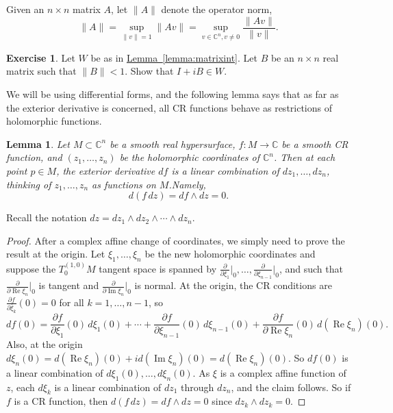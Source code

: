 \documentclass[12pt,openany]{book}
\renewcommand{\Re}{\operatorname{Re}}
\renewcommand{\Im}{\operatorname{Im}}
\newcommand{\snorm}[1]{\lVert {#1} \rVert}
\newcommand{\C}{{\mathbb{C}}}
\theoremstyle{plain}
\newtheorem{lemma}[thm]{Lemma}
\theoremstyle{remark}
\theoremstyle{definition}
\newenvironment{exbox}{%
    \def\FrameCommand{\vrule width 1pt \relax\hspace{10pt}}%
    \MakeFramed{\advance\hsize-\width\FrameRestore}%
}{%
    \endMakeFramed
}
\theoremstyle{exercise}
\newtheorem{exercise}{Exercise}[section]
\theoremstyle{example}
\newcommand{\lemmaref}[1]{\hyperref[#1]{Lemma~\ref*{#1}}}
\begin{document}
Given an $n \times n$ matrix $A$, let $\snorm{A}$ denote the operator norm,
\begin{equation*}
\snorm{A} = \sup_{\snorm{v}=1} \snorm{Av} = \sup_{v \in \C^n, v \neq 0}
\frac{\snorm{Av}}{\snorm{v}} .
\end{equation*}

\begin{exbox}
\begin{exercise}
Let $W$ be as in \lemmaref{lemma:matrixint}.  Let $B$ be an $n \times n$
real matrix such that $\snorm{B} < 1$.   Show that $I + iB \in W$.
\end{exercise}
\end{exbox}

We will be using differential forms, and the following lemma says
that as far as the exterior
derivative is concerned, all CR functions behave as
restrictions of holomorphic functions.

\begin{lemma} \label{lemma:crdf}
Let $M \subset \C^n$ be a smooth real hypersurface, $f \colon M \to \C$
be a smooth CR function, and $(z_1,\ldots,z_n)$ be the holomorphic
coordinates of $\C^n$.  Then at each point $p \in M$,
the exterior derivative
$df$ is a linear combination of $dz_1,\ldots,dz_n$,
thinking of $z_1,\ldots,z_n$ as functions on $M$.\linebreak[1]
Namely,
\begin{equation*}
d(f \, dz) = df \wedge dz = 0.
\end{equation*}
\end{lemma}

Recall the notation $dz = dz_1 \wedge dz_2 \wedge \cdots \wedge dz_n$.

\begin{proof}
After a complex affine change of coordinates, we simply
need to prove the result at the origin.  Let
$\xi_1,\ldots,\xi_n$ be
the new holomorphic coordinates
and suppose the $T^{(1,0)}_0 M$ tangent space is spanned
by
$\frac{\partial}{\partial \xi_1}\big|_0,
\ldots,
\frac{\partial}{\partial \xi_{n-1}}\big|_0$,
and such that $\frac{\partial}{\partial \Re \xi_n}\big|_0$ is tangent
and $\frac{\partial}{\partial \Im \xi_n}\big|_0$ is normal.
At the origin, the CR conditions are
$\frac{\partial f}{\partial \bar{\xi}_k}(0) = 0$ for all $k=1,\ldots,n-1$, so
\begin{equation*}
df(0) =
\frac{\partial f}{\partial \xi_1}(0) \, d\xi_1(0) + \cdots +
\frac{\partial f}{\partial \xi_{n-1}}(0) \, d\xi_{n-1}(0)  +
\frac{\partial f}{\partial \Re \xi_{n}}(0) \, d(\Re \xi_{n})(0)
.
\end{equation*}
Also, at the origin $d\xi_n(0) = d(\Re \xi_n)(0) + i d(\Im \xi_n)(0) = d(\Re \xi_n)(0)$.
So $df(0)$ is a linear combination of $d\xi_1(0),\ldots,d\xi_n(0)$.
As $\xi$ is a complex affine function of $z$, each $d\xi_k$ is a linear
combination of $dz_1$ through $dz_n$, and the claim follows.
So if $f$ is a CR function, then
$d(f\,dz) = df \wedge dz = 0$ since $dz_k \wedge dz_k = 0$.
\end{proof}
\end{document}
